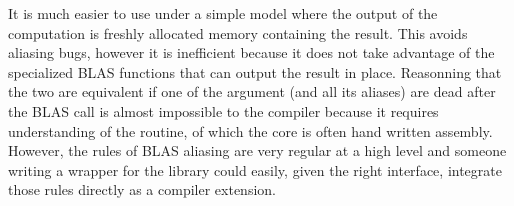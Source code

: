 \documentclass[11pt]{article}
\begin{document}
It is much easier to use under a simple model where the output of the computation is freshly allocated memory containing the result. This avoids aliasing bugs, however it is inefficient because it does not take advantage of the specialized BLAS functions that can output the result in place. Reasonning that the two are equivalent if one of the argument (and all its aliases) are dead after the BLAS call is almost impossible to the compiler because it requires understanding of the routine, of which the core is often hand written assembly. However, the rules of BLAS aliasing are very regular at a high level and someone writing a wrapper for the library could easily, given the right interface, integrate those rules directly as a compiler extension.
\end{document}
